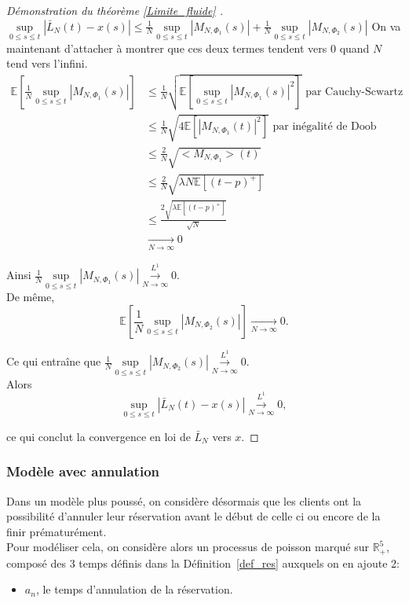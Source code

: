 \documentclass[12pt,a4paper]{article}
\newcommand{\E}[1]{\mathbb{E}\left[ #1 \right]}
\newcommand{\R}{\mathbb{R}}
\newcommand{\1}[1]{\mathbbm{1}_{\{#1\}} }
\theoremstyle{definition}
\begin{document}
{\begin{proof}[Démonstration du théorème \ref{Limite_fluide} ]
$\underset{0\leq s \leq t}{\sup} |\bar{L}_N(t)-x(s)| \leq \frac{1}{N}\underset{0\leq s \leq t}{\sup} |M_{N,\Phi_1}(s)| + \frac{1}{N}\underset{0\leq s \leq t}{\sup} |M_{N,\Phi_2}(s)| $
On va maintenant d'attacher à montrer que ces deux termes tendent vers 0 quand $N$ tend vers l'infini.
\begin{align*}
\E{\frac{1}{N}\underset{0\leq s \leq t}{\sup} |M_{N,\Phi_1}(s)|} &\leq \frac{1}{N}\sqrt{\E{\underset{0\leq s \leq t}{\sup} |M_{N,\Phi_1}(s)|^2}} \text{ par Cauchy-Scwartz}\\
& \leq \frac{1}{N}\sqrt{4 \E{|M_{N,\Phi_1}(t)|^2}}  \text{ par inégalité de Doob}\\
& \leq \frac{2}{N}\sqrt{<M_{N,\Phi_1}>(t)}\\
&\leq \frac{2}{N}\sqrt{ \lambda N \E{(t-p)^+}}\\
&\leq \frac{2\sqrt{ \lambda \E{(t-p)^+}}}{\sqrt{N}}\\
& \underset{N \to \infty}{\to} 0
\end{align*}


Ainsi $\frac{1}{N}\underset{0\leq s \leq t}{\sup} |M_{N,\Phi_1}(s)|\overset{L^1}{\underset{N \to \infty}{\to}} 0$.\\
 
De même, $$\E{\frac{1}{N}\underset{0\leq s \leq t}{\sup} |M_{N,\Phi_2}(s)|} \underset{N \to \infty}{\to} 0.$$

Ce qui entraîne que $\frac{1}{N}\underset{0\leq s \leq t}{\sup} |M_{N,\Phi_2}(s)|\overset{L^1}{\underset{N \to \infty}{\to}} 0.$\\


Alors $$ \underset{0\leq s \leq t}{\sup} |\bar{L}_N(t)-x(s)|\overset{L^1}{\underset{N \to \infty}{\to}} 0,$$

ce qui conclut la convergence en loi de $\bar{L}_N$ vers $x$.



\end{proof}
\subsubsection{Modèle avec annulation}

Dans un modèle plus poussé, on considère désormais que les clients ont la possibilité d'annuler leur réservation avant le début de celle ci ou encore de la finir prématurément.\\

Pour modéliser cela, on considère alors un processus de poisson marqué sur $\R_+^5$, composé des 3 temps définis dans la Définition~\ref{def_res} auxquels on en ajoute 2:
\begin{itemize}
\item $a_n$, le temps d'annulation de la réservation.


\end{itemize}}
\end{document}
